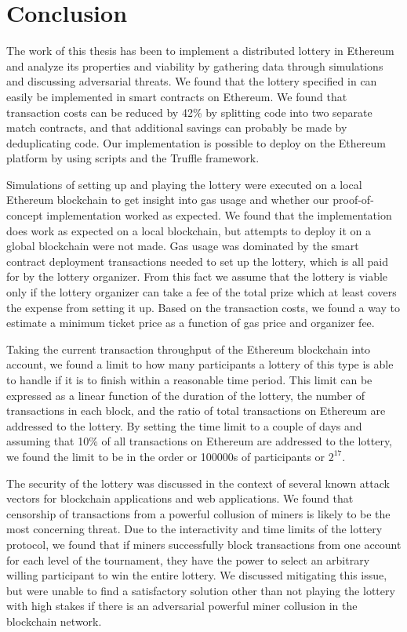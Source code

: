 \chapter{Conclusion}
\label{chap:conclusion}


The work of this thesis has been to implement a distributed lottery in Ethereum and analyze its properties and viability by gathering data through simulations and discussing adversarial threats. We found that the lottery specified in \cite{miller_zero-collateral_2017} can easily be implemented in smart contracts on Ethereum. We found that transaction costs can be reduced by 42\% by splitting code into two separate match contracts, and that additional savings can probably be made by deduplicating code. Our implementation is possible to deploy on the Ethereum platform by using scripts and the Truffle framework.

Simulations of setting up and playing the lottery were executed on a local Ethereum blockchain to get insight into gas usage and whether our proof-of-concept implementation worked as expected. We found that the implementation does work as expected on a local blockchain, but attempts to deploy it on a global blockchain were not made. Gas usage was dominated by the smart contract deployment transactions needed to set up the lottery, which is all paid for by the lottery organizer. From this fact we assume that the lottery is viable only if the lottery organizer can take a fee of the total prize which at least covers the expense from setting it up. Based on the transaction costs, we found a way to estimate a minimum ticket price as a function of gas price and organizer fee.

Taking the current transaction throughput of the Ethereum blockchain into account, we found a limit to how many participants a lottery of this type is able to handle if it is to finish within a reasonable time period. This limit can be expressed as a linear function of the duration of the lottery, the number of transactions in each block, and the ratio of total transactions on Ethereum are addressed to the lottery. By setting the time limit to a couple of days and assuming that 10\% of all transactions on Ethereum are addressed to the lottery, we found the limit to be in the order or 100000s of participants or $2^{17}$.

The security of the lottery was discussed in the context of several known attack vectors for blockchain applications and web applications. We found that censorship of transactions from a powerful collusion of miners is likely to be the most concerning threat. Due to the interactivity and time limits of the lottery protocol, we found that if miners successfully block transactions from one account for each level of the tournament, they have the power to select an arbitrary willing participant to win the entire lottery.
We discussed mitigating this issue, but were unable to find a satisfactory solution other than not playing the lottery with high stakes if there is an adversarial powerful miner collusion in the blockchain network. 

